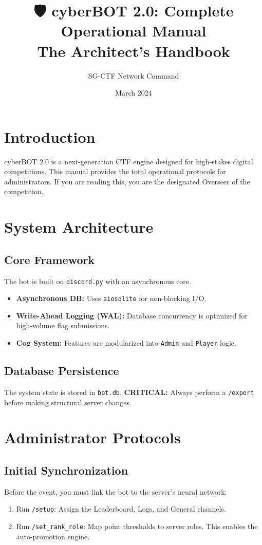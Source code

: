 \documentclass[12pt,a4paper]{article}
\title{🛡️ cyberBOT 2.0: Complete Operational Manual \\ \small{The Architect's Handbook}}
\author{SG-CTF Network Command}
\date{March 2024}
\begin{document}
\maketitle
\tableofcontents
\newpage

\section{Introduction}
cyberBOT 2.0 is a next-generation CTF engine designed for high-stakes digital competitions. This manual provides the total operational protocols for administrators. If you are reading this, you are the designated Overseer of the competition.

\section{System Architecture}
\subsection{Core Framework}
The bot is built on \texttt{discord.py} with an asynchronous core.
\begin{itemize}
    \item \textbf{Asynchronous DB:} Uses \texttt{aiosqlite} for non-blocking I/O.
    \item \textbf{Write-Ahead Logging (WAL):} Database concurrency is optimized for high-volume flag submissions.
    \item \textbf{Cog System:} Features are modularized into \texttt{Admin} and \texttt{Player} logic.
\end{itemize}

\subsection{Database Persistence}
The system state is stored in \texttt{bot.db}. 
\textbf{CRITICAL:} Always perform a \texttt{/export} before making structural server changes.

\section{Administrator Protocols}
\subsection{Initial Synchronization}
Before the event, you must link the bot to the server's neural network:
\begin{enumerate}
    \item Run \texttt{/setup}: Assign the Leaderboard, Logs, and General channels.
    \item Run \texttt{/set\_rank\_role}: Map point thresholds to server roles. This enables the auto-promotion engine.
\end{enumerate}
\end{document}
